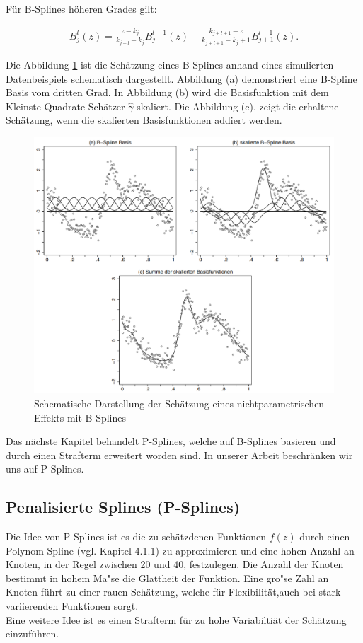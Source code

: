 \documentclass[12pt]{scrreprt}
\begin{document}
	\newpage
	\noindent Für B-Splines höheren Grades gilt:
	
	\begin{align}
	B_{j}^l(z)= \frac{z-k_{j}}{k_{j+l}-k_{j}}B_{j}^{l-1}(z)+
				\frac{k_{j+l+1}-z}{k_{j+l+1}-k_j+1}B_{j+1}^{l-1}(z).
	\end{align}
	
	\noindent Die Abbildung \ref{pic:b_spline} ist die Schätzung eines B-Splines anhand eines simulierten Datenbeispiels schematisch dargestellt. Abbildung (a) demonstriert eine B-Spline Basis vom dritten Grad. In Abbildung (b) wird die Basisfunktion mit dem Kleinste-Quadrate-Schätzer $\hat\gamma$ skaliert. Die Abbildung (c), zeigt die erhaltene Schätzung, wenn die skalierten Basisfunktionen addiert werden.
		\begin{figure}[H]
		\centering
		\includegraphics[width=.9\textwidth]{bilder/b_spline_basis}
		\caption{Schematische Darstellung der Schätzung eines nichtparametrischen Effekts mit B-Splines}
		\label{pic:b_spline}
	\end{figure}
	\noindent Das nächste Kapitel behandelt P-Splines, welche auf B-Splines basieren und durch einen Strafterm erweitert worden sind. In unserer Arbeit beschränken wir uns auf P-Splines.
	
	\subsection{Penalisierte Splines (P-Splines)} 
	Die Idee von P-Splines ist es die zu schätzdenen Funktionen $f(z)$ durch einen Polynom-Spline (vgl. Kapitel 4.1.1) zu approximieren und eine hohen Anzahl an Knoten, in der Regel zwischen 20 und 40, festzulegen. Die Anzahl der Knoten bestimmt in hohem Ma"se die Glattheit der Funktion. Eine gro"se Zahl an Knoten führt zu einer rauen Schätzung, welche für Flexibilität,auch bei stark variierenden Funktionen sorgt. \\
	Eine weitere Idee ist es einen Strafterm für zu hohe Variabiltiät der Schätzung einzuführen. \\
	
\end{document}
